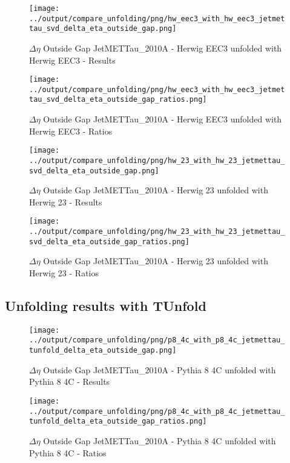 \documentclass[11pt]{book}
\begin{document}
\begin{figure}[ht]
\centering
\texttt{[image: ../output/compare\_unfolding/png/hw\_eec3\_with\_hw\_eec3\_jetmettau\_svd\_delta\_eta\_outside\_gap.png]}
\caption{$\Delta\eta$ Outside Gap JetMETTau\_2010A - Herwig EEC3 unfolded with Herwig EEC3 - Results}
\label{hw_eec3_hw_eec3_jetmettau_svd_delta_eta_outside_gap_a}
\end{figure}

\begin{figure}[ht]
\centering
\texttt{[image: ../output/compare\_unfolding/png/hw\_eec3\_with\_hw\_eec3\_jetmettau\_svd\_delta\_eta\_outside\_gap\_ratios.png]}
\caption{$\Delta\eta$ Outside Gap JetMETTau\_2010A - Herwig EEC3 unfolded with Herwig EEC3 - Ratios}
\label{hw_eec3_hw_eec3_jetmettau_svd_delta_eta_outside_gap_b}
\end{figure}

\begin{figure}[ht]
\centering
\texttt{[image: ../output/compare\_unfolding/png/hw\_23\_with\_hw\_23\_jetmettau\_svd\_delta\_eta\_outside\_gap.png]}
\caption{$\Delta\eta$ Outside Gap JetMETTau\_2010A - Herwig 23 unfolded with Herwig 23 - Results}
\label{hw_23_hw_23_jetmettau_svd_delta_eta_outside_gap_a}
\end{figure}

\begin{figure}[ht]
\centering
\texttt{[image: ../output/compare\_unfolding/png/hw\_23\_with\_hw\_23\_jetmettau\_svd\_delta\_eta\_outside\_gap\_ratios.png]}
\caption{$\Delta\eta$ Outside Gap JetMETTau\_2010A - Herwig 23 unfolded with Herwig 23 - Ratios}
\label{hw_23_hw_23_jetmettau_svd_delta_eta_outside_gap_b}
\end{figure}


\clearpage
\subsection{Unfolding results with TUnfold}

\begin{figure}[ht]
\centering
\texttt{[image: ../output/compare\_unfolding/png/p8\_4c\_with\_p8\_4c\_jetmettau\_tunfold\_delta\_eta\_outside\_gap.png]}
\caption{$\Delta\eta$ Outside Gap JetMETTau\_2010A - Pythia 8 4C unfolded with Pythia 8 4C - Results}
\label{p8_p8_jetmettau_tunfold_delta_eta_outside_gap_a}
\end{figure}

\begin{figure}[ht]
\centering
\texttt{[image: ../output/compare\_unfolding/png/p8\_4c\_with\_p8\_4c\_jetmettau\_tunfold\_delta\_eta\_outside\_gap\_ratios.png]}
\caption{$\Delta\eta$ Outside Gap JetMETTau\_2010A - Pythia 8 4C unfolded with Pythia 8 4C - Ratios}
\label{p8_p8_jetmettau_tunfold_delta_eta_outside_gap_b}
\end{figure}
\end{document}
